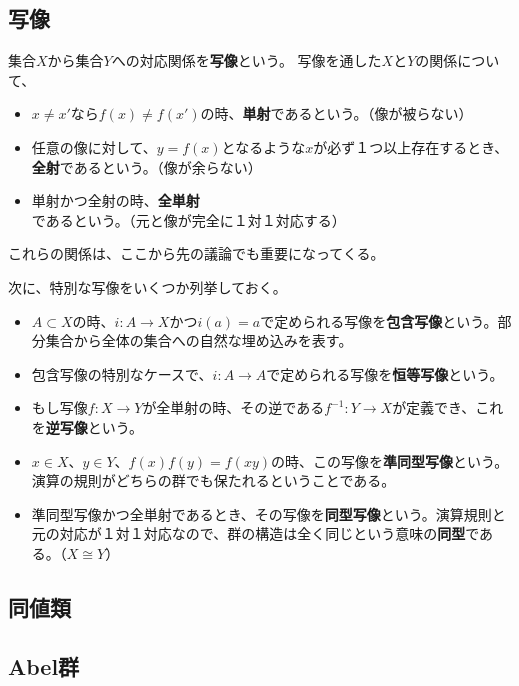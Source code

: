 \documentclass[a4paper]{jsreport}
\begin{document}
            \subsection*{写像}
                集合$X$から集合$Y$への対応関係を\textbf{写像}という。
                写像を通した$X$と$Y$の関係について、
                \begin{itemize}
                    \item $x \neq x'$なら$f(x) \neq f(x')$の時、\textbf{単射}であるという。（像が被らない）
                    \item 任意の像に対して、$y = f(x)$となるような$x$が必ず１つ以上存在するとき、\textbf{全射}であるという。（像が余らない）
                    \item 単射かつ全射の時、\textbf{全単射}であるという。（元と像が完全に１対１対応する）
                \end{itemize}
                これらの関係は、ここから先の議論でも重要になってくる。\par
                次に、特別な写像をいくつか列挙しておく。
                \begin{itemize}
                    \item $A \subset X$の時、$i: A \to X$かつ$i(a) = a$で定められる写像を\textbf{包含写像}という。部分集合から全体の集合への自然な埋め込みを表す。
                    \item 包含写像の特別なケースで、$i: A \to A$で定められる写像を\textbf{恒等写像}という。
                    \item もし写像$f: X \to Y$が全単射の時、その逆である$f^{-1}: Y \to X$が定義でき、これを\textbf{逆写像}という。
                    \item $x \in X$、$y \in Y$、$f(x)f(y) = f(xy)$の時、この写像を\textbf{準同型写像}という。演算の規則がどちらの群でも保たれるということである。
                    \item 準同型写像かつ全単射であるとき、その写像を\textbf{同型写像}という。演算規則と元の対応が１対１対応なので、群の構造は全く同じという意味の\textbf{同型}である。（$X \cong Y$）
                \end{itemize}

            \subsection*{同値類}


            \subsection*{Abel群}
\end{document}
